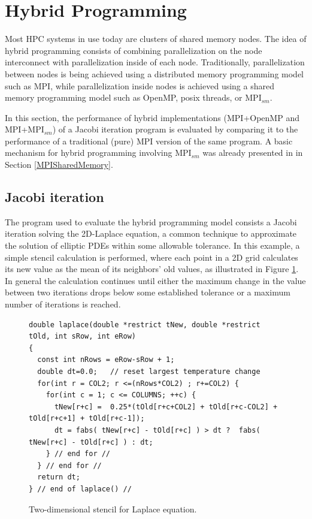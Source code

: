\section{Hybrid Programming} %

Most HPC systems in use today are clusters of shared memory nodes. The idea of hybrid programming consists of combining parallelization on the node interconnect with parallelization inside of each node. Traditionally, parallelization between nodes is being achieved using a distributed memory programming model such as MPI, while parallelization inside nodes is achieved using a shared memory programming model such as OpenMP, posix threads, or MPI$_{sm}$. 

\medskip

In this section, the performance of hybrid implementations (MPI+OpenMP and MPI+MPI$_{sm}$) of a Jacobi iteration program is evaluated by comparing it to the performance of a traditional (pure) MPI version of the same program. A basic mechanism for hybrid programming involving MPI$_{sm}$ was already presented in in Section \ref{MPISharedMemory}.

\medskip

\subsection*{Jacobi iteration}

The program used to evaluate the hybrid programming model consists a Jacobi iteration solving the 2D-Laplace equation, a common technique to approximate the solution of elliptic PDEs within some allowable tolerance. In this example, a simple stencil calculation is performed, where each point in a 2D grid calculates its new value as the mean of its neighbors' old values, as illustrated in Figure \ref{fig:LaplacePureMPI}. In general the calculation continues until either the maximum change in the value between two iterations drops below some established tolerance or a maximum number of iterations is reached.

\medskip

\begin{figure} [h!]
\centering
\captionsetup{justification=centering, singlelinecheck=false}
\begin{lstlisting}[style=CStyle]
double laplace(double *restrict tNew, double *restrict tOld, int sRow, int eRow)
{
  const int nRows = eRow-sRow + 1;
  double dt=0.0;   // reset largest temperature change
  for(int r = COL2; r <=(nRows*COL2) ; r+=COL2) {
    for(int c = 1; c <= COLUMNS; ++c) {
      tNew[r+c] =  0.25*(tOld[r+c+COL2] + tOld[r+c-COL2] + tOld[r+c+1] + tOld[r+c-1]);
      dt = fabs( tNew[r+c] - tOld[r+c] ) > dt ?  fabs( tNew[r+c] - tOld[r+c] ) : dt;
    } // end for //
  } // end for //
  return dt;
} // end of laplace() //
\end{lstlisting}    
\caption{Two-dimensional stencil for Laplace equation.}
\label{fig:LaplacePureMPI}
\end{figure}


